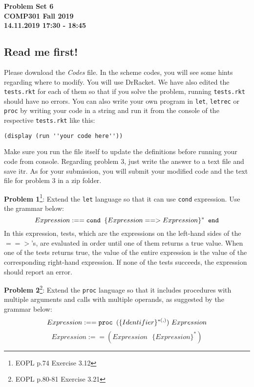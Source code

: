 \documentclass[12pt,reqno]{amsart}
\newcommand{\code}[1]{\texttt{#1}}
\begin{document}
\thispagestyle{empty}
\begin{center}
\large\textbf{Problem Set 6 \\ COMP301 Fall 2019} \\
\normalsize\textbf{14.11.2019 17:30 - 18:45} \\
\end{center}

\vspace{7.5mm}

\subsection*{Read me first!} Please download the \textit{Codes} file. In the scheme codes, you will see some hints regarding where to modify. You will use DrRacket. We have also edited the \code{tests.rkt} for each of them so that if you solve the problem, running \code{tests.rkt} should have no errors. You can also write your own program in \code{let}, \code{letrec} or \code{proc} by writing your code in a string and run it from the console of the respective \code{tests.rkt} like this:
\begin{lstlisting}
(display (run ''your code here''))
\end{lstlisting}
Make sure you run the file itself to update the definitions before running your code from console. Regarding problem 3, just write the answer to a text file and save itr. As for your submission, you will submit your modified code and the text file for problem 3 in a zip folder.

\vspace{7.5mm}

\textbf{Problem 1}\footnote{EOPL p.74 Exercise 3.12}: Extend the \code{let} language so that it can use \code{cond} expression. Use the grammar below:
$$
Expression :== \text{\code{cond }} \{Expression ==> Expression\}^* \text{\code{ end}}
$$
In this expression, tests, which are the expressions on the left-hand sides of the $==>$’s, are evaluated in order until one of them returns a true value. When one of the tests returns true, the value of the entire expression is the value of the corresponding right-hand expression. If none of the tests succeeds, the expression should report an error.

\vspace{7.5mm}

\textbf{Problem 2}\footnote{EOPL p.80-81 Exercise 3.21}: Extend the \code{proc} language so that it includes procedures with multiple arguments and calls with multiple operands, as suggested by the grammar below:
$$
Expression :== \text{\code{proc }} (\{Identifier\}^{*(,)}) \text{ } Expression
$$
$$
Expression :== (Expression \text{ } \{Expression\}^*)
$$
\end{document}

